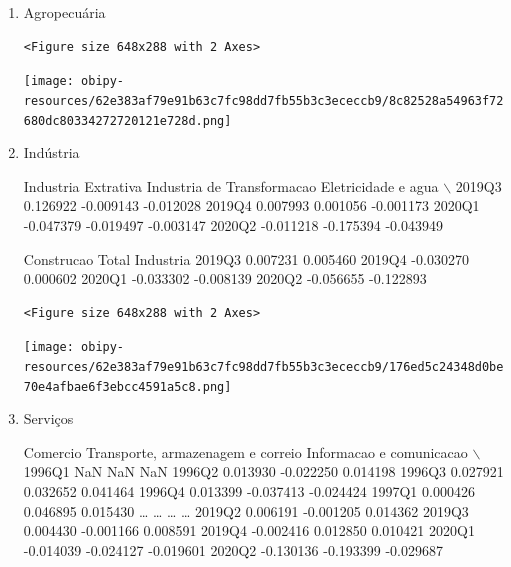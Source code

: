 \documentclass[11pt]{article}
\begin{document}
\begin{enumerate}
\item Agropecuária
\label{sec:org70ee122}

\begin{verbatim}
<Figure size 648x288 with 2 Axes>
\end{verbatim}


\begin{center}
\texttt{[image: obipy-resources/62e383af79e91b63c7fc98dd7fb55b3c3ececcb9/8c82528a54963f72680dc80334272720121e728d.png]}
\end{center}

\item Indústria
\label{sec:org29da86c}

        Industria Extrativa  Industria de Transformacao  Eletricidade e agua  $\backslash$
2019Q3             0.126922                   -0.009143            -0.012028   
2019Q4             0.007993                    0.001056            -0.001173   
2020Q1            -0.047379                   -0.019497            -0.003147   
2020Q2            -0.011218                   -0.175394            -0.043949   

        Construcao  Total Industria  
2019Q3    0.007231         0.005460  
2019Q4   -0.030270         0.000602  
2020Q1   -0.033302        -0.008139  
2020Q2   -0.056655        -0.122893  

\begin{verbatim}
<Figure size 648x288 with 2 Axes>
\end{verbatim}


\begin{center}
\texttt{[image: obipy-resources/62e383af79e91b63c7fc98dd7fb55b3c3ececcb9/176ed5c24348d0be70e4afbae6f3ebcc4591a5c8.png]}
\end{center}


\item Serviços
\label{sec:org478080b}

        Comercio  Transporte, armazenagem e correio  Informacao e comunicacao  $\backslash$
1996Q1       NaN                                NaN                       NaN   
1996Q2  0.013930                          -0.022250                  0.014198   
1996Q3  0.027921                           0.032652                  0.041464   
1996Q4  0.013399                          -0.037413                 -0.024424   
1997Q1  0.000426                           0.046895                  0.015430   
\ldots{}          \ldots{}                                \ldots{}                       \ldots{}   
2019Q2  0.006191                          -0.001205                  0.014362   
2019Q3  0.004430                          -0.001166                  0.008591   
2019Q4 -0.002416                           0.012850                  0.010421   
2020Q1 -0.014039                          -0.024127                 -0.019601   
2020Q2 -0.130136                          -0.193399                 -0.029687   


\end{enumerate}
\end{document}

